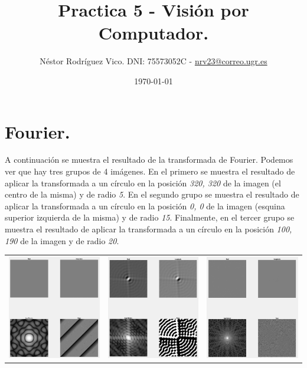 \documentclass[12pt]{article}
\title{Practica 5 - Visión por Computador.}
\author{Néstor Rodríguez Vico. DNI: 75573052C - \href{mailto:nrv23@correo.ugr.es}{nrv23@correo.ugr.es}}
\date{\today}
\begin{document}
\maketitle

\setlength{\belowdisplayskip}{5pt} 
\setlength{\belowdisplayshortskip}{5pt}
\setlength{\abovedisplayskip}{5pt} 
\setlength{\abovedisplayshortskip}{5pt}

\section{Fourier.}

A continuación se muestra el resultado de la transformada de Fourier. Podemos ver que hay tres grupos de 4 imágenes. En el primero se muestra el resultado de aplicar la transformada a un círculo en la posición \textit{320, 320} de la imagen (el centro de la misma) y de radio \textit{5}. En el segundo grupo se muestra el resultado de aplicar la transformada a un círculo en la posición \textit{0, 0} de la imagen (esquina superior izquierda de la misma) y de radio \textit{15}. Finalmente, en el tercer grupo se muestra el resultado de aplicar la transformada a un círculo en la posición \textit{100, 190} de la imagen y de radio \textit{20}. \\

\begin{table}[H]
	\begin{tabular}{ccc}
		\includegraphics[width=0.3\linewidth]{images/f1.png} & \includegraphics[width=0.3\linewidth]{images/f2.png} & \includegraphics[width=0.3\linewidth]{images/f3.png}
	\end{tabular}
\end{table}
\end{document}
